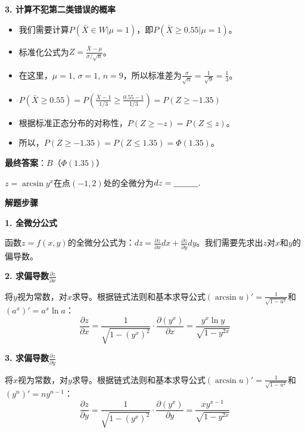 \documentclass[standard]{ExBook}
\begin{document}
\begin{qitems}
\begin{bbox}
\begin{solution}
            \textbf{3. 计算不犯第二类错误的概率}
            \begin{itemize}
                \item 我们需要计算$P(\bar{X}\in W | \mu=1)$，即$P(\bar{X}\ge 0.55 | \mu=1)$。
                \item 标准化公式为$Z=\frac{\bar{X}-\mu}{\sigma/\sqrt{n}}$。
                \item 在这里，$\mu=1$, $\sigma=1$, $n=9$，所以标准差为$\frac{\sigma}{\sqrt{n}}=\frac{1}{\sqrt{9}}=\frac{1}{3}$。
                \item $P(\bar{X}\ge 0.55) = P\left(\frac{\bar{X}-1}{1/3} \ge \frac{0.55-1}{1/3}\right) = P(Z \ge -1.35)$
                \item 根据标准正态分布的对称性，$P(Z \ge -z) = P(Z \le z)$。
                \item 所以，$P(Z \ge -1.35) = P(Z \le 1.35) = \Phi(1.35)$。
            \end{itemize}
            
            \textbf{最终答案}：$B$（$\Phi(1.35)$）
        \end{solution}
    \end{bbox}

    \begin{bbox}
        \qitem $z=\arcsin y^x$在点$(-1,2)$处的全微分为$dz=\underline{\hspace{3em}}.$
        \begin{solution}
            \textbf{解题步骤}
            
            \textbf{1. 全微分公式}
            
            函数$z=f(x,y)$的全微分公式为：$dz = \frac{\partial z}{\partial x}dx + \frac{\partial z}{\partial y}dy$。我们需要先求出$z$对$x$和$y$的偏导数。
            
            \textbf{2. 求偏导数$\frac{\partial z}{\partial x}$}
            
            将$y$视为常数，对$x$求导。根据链式法则和基本求导公式$(\arcsin u)'=\frac{1}{\sqrt{1-u^2}}$和$(a^x)'=a^x\ln a$：
            $$\frac{\partial z}{\partial x} = \frac{1}{\sqrt{1-(y^x)^2}} \cdot \frac{\partial(y^x)}{\partial x} = \frac{y^x\ln y}{\sqrt{1-y^{2x}}}$$
            
            \textbf{3. 求偏导数$\frac{\partial z}{\partial y}$}
            
            将$x$视为常数，对$y$求导。根据链式法则和基本求导公式$(\arcsin u)'=\frac{1}{\sqrt{1-u^2}}$和$(y^n)'=ny^{n-1}$：
            $$\frac{\partial z}{\partial y} = \frac{1}{\sqrt{1-(y^x)^2}} \cdot \frac{\partial(y^x)}{\partial y} = \frac{xy^{x-1}}{\sqrt{1-y^{2x}}}$$
            

\end{solution}
\end{bbox}
\end{qitems}
\end{document}
